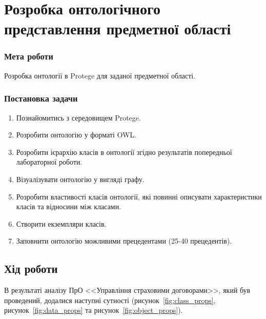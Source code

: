 



\newcommand{\labnumber}{2} %



\graphicspath{{figures/}}


\Ukrainian


\addtocounter{page}{1}

\section*{Розробка онтологічного представлення предметної області}
\subsubsection*{Мета роботи}
Розробка онтології в Protege для заданої предметної області.
\subsubsection*{Постановка задачи}
\begin{enumerate}
	\item Познайомитись з середовищем Protege. 
	\item Розробити онтологію у форматі OWL. 
	\item Розробити ієрархію класів в онтології згідно результатів попередньої лабораторної роботи. 
	\item Візуалізувати онтологію у вигляді графу. 
	\item Розробити властивості класів онтології, які повинні описувати характеристики класів та відносини між класами. 
	\item Створити екземпляри класів. 
	\item Заповнити онтологію можливими прецедентами (25-40 прецедентів).
\end{enumerate}

\subsection*{Хід роботи}
В результаті аналізу ПрО <<Управління страховими договорами>>, який був проведений, додалися наступні сутності (рисунок~\ref{fig:class_props}, рисунок~\ref{fig:data_props} та рисунок~\ref{fig:object_props}).


